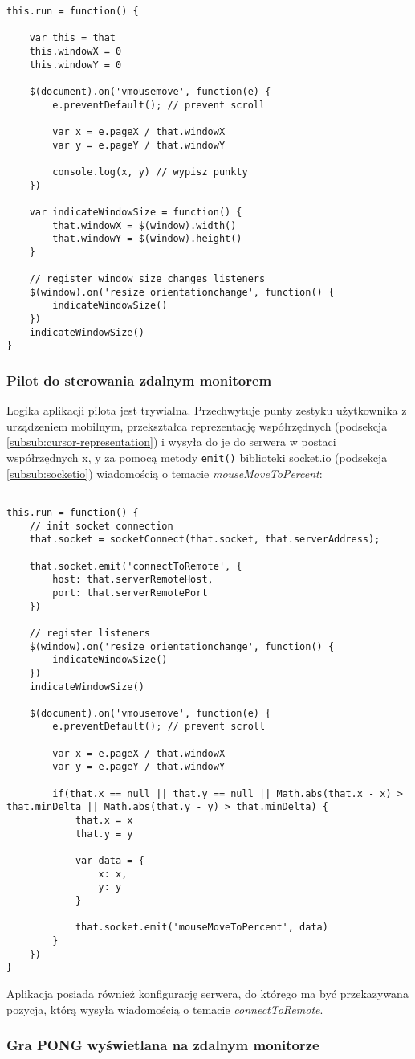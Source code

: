 \lstset{language=JavaScript}
\begin{lstlisting}
this.run = function() {
	
	var this = that
	this.windowX = 0
	this.windowY = 0
	
	$(document).on('vmousemove', function(e) {
		e.preventDefault(); // prevent scroll
		
		var x = e.pageX / that.windowX
		var y = e.pageY / that.windowY
		
		console.log(x, y) // wypisz punkty
	})
	
	var indicateWindowSize = function() {
		that.windowX = $(window).width()
		that.windowY = $(window).height()
	}
	
	// register window size changes listeners
	$(window).on('resize orientationchange', function() {
		indicateWindowSize()
	})
	indicateWindowSize()
}
\end{lstlisting}

\subsubsection{Pilot do sterowania zdalnym monitorem}

Logika aplikacji pilota jest trywialna. Przechwytuje punty zestyku użytkownika z urządzeniem mobilnym, przekształca reprezentację współrzędnych (podsekcja \ref{subsub:cursor-representation}) i wysyła do je do serwera w postaci współrzędnych x, y za pomocą metody \lstinline{emit()} biblioteki socket.io (podsekcja \ref{subsub:socketio}) wiadomością o temacie \emph{mouseMoveToPercent}:

\lstset{language=JavaScript}
\begin{lstlisting}

this.run = function() {
	// init socket connection
	that.socket = socketConnect(that.socket, that.serverAddress);
	
	that.socket.emit('connectToRemote', {
		host: that.serverRemoteHost,
		port: that.serverRemotePort
	})
	
	// register listeners
	$(window).on('resize orientationchange', function() {
		indicateWindowSize()
	})
	indicateWindowSize()
	
	$(document).on('vmousemove', function(e) {
		e.preventDefault(); // prevent scroll
		
		var x = e.pageX / that.windowX
		var y = e.pageY / that.windowY
		
		if(that.x == null || that.y == null || Math.abs(that.x - x) > that.minDelta || Math.abs(that.y - y) > that.minDelta) {
			that.x = x
			that.y = y
			
			var data = {
				x: x,
				y: y
			}
			
			that.socket.emit('mouseMoveToPercent', data)
		}
	})
}
\end{lstlisting}

Aplikacja posiada również konfigurację serwera, do którego ma być przekazywana pozycja, którą wysyła wiadomością o temacie \emph{connectToRemote}.

\subsubsection{Gra PONG wyświetlana na zdalnym monitorze}


